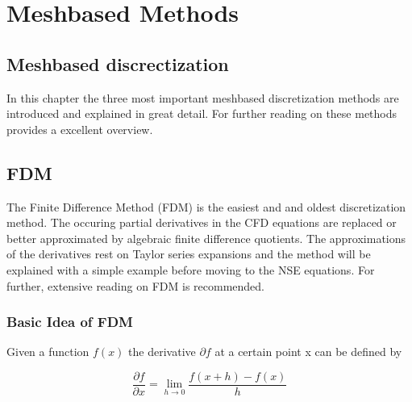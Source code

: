 
\chapter{Meshbased Methods} %

\label{Chapter4} %



\section{Meshbased discrectization}

In this chapter the three most important meshbased discretization methods are introduced and explained in great detail. For further reading on these methods
\citep{Ferziger2002} provides a excellent overview. 


\section{FDM}

The Finite Difference Method (FDM) is the easiest and and oldest discretization method. The occuring partial derivatives in the CFD equations
are replaced or better approximated by algebraic finite difference quotients. The approximations of the derivatives rest on Taylor series
expansions and the method will be explained with a simple example before moving to 
the NSE equations. For further, extensive reading on FDM \citep[chap. 8]{Pozrikidis2009} is recommended.

\subsection{Basic Idea of FDM}

Given a function $ f(x) $ the derivative $\partial f$  at a certain point x can be defined by


\begin{equation} \label{eq:fdm_con}
\frac {\partial f}{\partial x}  = 
\lim_{h \to 0} \frac {f(x+h)-f(x)}{h} 
\end{equation}

